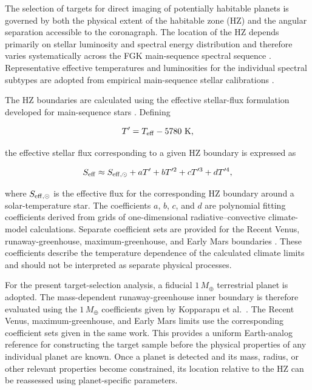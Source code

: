 The selection of targets for direct imaging of potentially habitable planets is
governed by both the physical extent of the habitable zone (HZ) and the angular
separation accessible to the coronagraph. The location of the HZ depends primarily
on stellar luminosity and spectral energy distribution and therefore varies
systematically across the FGK main-sequence spectral sequence
\cite{Kopparapu13,kopparapu14}. Representative effective temperatures and
luminosities for the individual spectral subtypes are adopted from empirical
main-sequence stellar calibrations \cite{pecaut13}.

The HZ boundaries are calculated using the effective stellar-flux formulation
developed for main-sequence stars \cite{Kopparapu13,kopparapu14}. Defining

\begin{equation}
T' = T_{\rm eff} - 5780~{\rm K},
\label{eq:hz-temperature}
\end{equation}

\noindent
the effective stellar flux corresponding to a given HZ boundary is expressed as

\begin{equation}
S_{\rm eff}
\approx
S_{\rm eff,\odot}
+aT'
+bT'^2
+cT'^3
+dT'^4 ,
\label{eq:seff}
\end{equation}

\noindent
where $S_{\rm eff,\odot}$ is the effective flux for the corresponding HZ boundary
around a solar-temperature star. The coefficients $a$, $b$, $c$, and $d$ are
polynomial fitting coefficients derived from grids of one-dimensional
radiative--convective climate-model calculations. Separate coefficient sets are
provided for the Recent Venus, runaway-greenhouse, maximum-greenhouse, and
Early Mars boundaries \cite{Kopparapu13,kopparapu14}. These coefficients
describe the temperature dependence of the calculated climate limits and should
not be interpreted as separate physical processes.

For the present target-selection analysis, a fiducial $1\,M_{\oplus}$ terrestrial
planet is adopted. The mass-dependent runaway-greenhouse inner boundary is
therefore evaluated using the $1\,M_{\oplus}$ coefficients given by
Kopparapu et al.~\cite{kopparapu14}. The Recent Venus, maximum-greenhouse,
and Early Mars limits use the corresponding coefficient sets given in the same
work. This provides a uniform Earth-analog reference for constructing the target
sample before the physical properties of any individual planet are known. Once
a planet is detected and its mass, radius, or other relevant properties become
constrained, its location relative to the HZ can be reassessed using
planet-specific parameters.

